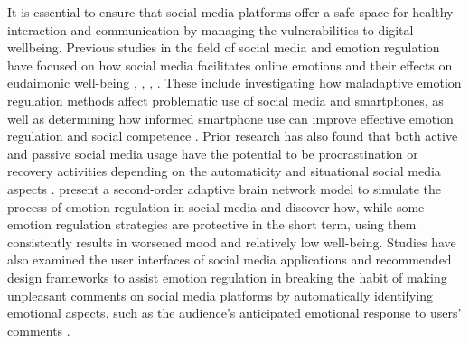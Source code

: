 \documentclass[acmtog]{acmart}
\begin{document}
It is essential to ensure that social media platforms offer a safe space for healthy interaction and communication by managing the vulnerabilities to digital wellbeing. Previous studies in the field of social media and emotion regulation have focused on how social media facilitates online emotions and their effects on eudaimonic well-being \cite{goldenberg2020digital}, \cite{steinert2021corona}, \cite{yang2020social}, \cite{yue2022passive}. These include investigating how maladaptive emotion regulation methods affect problematic use of social media and smartphones, as well as determining how informed smartphone use can improve effective emotion regulation and social competence \cite{zsido2021role}. Prior research has also found that both active and passive social media usage have the potential to be procrastination or recovery activities depending on the automaticity and situational social media aspects \cite{hossain2022motivational}. \cite{ments2021second} present a second-order adaptive brain network model to simulate the process of emotion regulation in social media and discover how, while some emotion regulation strategies are protective in the short term, using them consistently results in worsened mood and relatively low well-being. Studies have also examined the user interfaces of social media applications and recommended design frameworks to assist emotion regulation in breaking the habit of making unpleasant comments on social media platforms by automatically identifying emotional aspects, such as the audience's anticipated emotional response to users' comments \cite{kiskola2021applying}.
\end{document}
